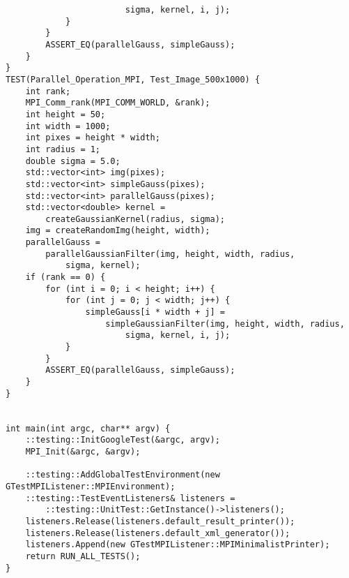 \documentclass{report}
\begin{document}
\begin{lstlisting}
                        sigma, kernel, i, j);
            }
        }
        ASSERT_EQ(parallelGauss, simpleGauss);
    }
}
TEST(Parallel_Operation_MPI, Test_Image_500x1000) {
    int rank;
    MPI_Comm_rank(MPI_COMM_WORLD, &rank);
    int height = 50;
    int width = 1000;
    int pixes = height * width;
    int radius = 1;
    double sigma = 5.0;
    std::vector<int> img(pixes);
    std::vector<int> simpleGauss(pixes);
    std::vector<int> parallelGauss(pixes);
    std::vector<double> kernel =
        createGaussianKernel(radius, sigma);
    img = createRandomImg(height, width);
    parallelGauss =
        parallelGaussianFilter(img, height, width, radius,
            sigma, kernel);
    if (rank == 0) {
        for (int i = 0; i < height; i++) {
            for (int j = 0; j < width; j++) {
                simpleGauss[i * width + j] =
                    simpleGaussianFilter(img, height, width, radius,
                        sigma, kernel, i, j);
            }
        }
        ASSERT_EQ(parallelGauss, simpleGauss);
    }
}


int main(int argc, char** argv) {
    ::testing::InitGoogleTest(&argc, argv);
    MPI_Init(&argc, &argv);

    ::testing::AddGlobalTestEnvironment(new GTestMPIListener::MPIEnvironment);
    ::testing::TestEventListeners& listeners =
        ::testing::UnitTest::GetInstance()->listeners();
    listeners.Release(listeners.default_result_printer());
    listeners.Release(listeners.default_xml_generator());
    listeners.Append(new GTestMPIListener::MPIMinimalistPrinter);
    return RUN_ALL_TESTS();
}

\end{lstlisting}
\end{document}
